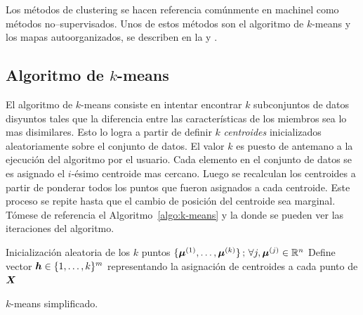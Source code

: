 Los métodos de clustering se hacen referencia comúnmente en \gls{machinel} como métodos no--supervisados. Unos de estos métodos son el algoritmo de $k$-means y los mapas autoorganizados, se describen en la  y .


\subsection{Algoritmo de $k$-means} \label{ch:k-means}
El algoritmo de $k$-means consiste en intentar encontrar $k$ subconjuntos de datos disyuntos tales que la diferencia entre las características de los miembros sea lo mas disimilares. Esto lo logra a partir de definir $k$ \textit{centroides} inicializados aleatoriamente sobre el conjunto de datos. El valor $k$ es puesto de antemano a la ejecución del algoritmo por el usuario. Cada elemento en el conjunto de datos se es asignado el $i$-ésimo centroide mas cercano. Luego se recalculan los centroides a partir de ponderar todos los puntos que fueron asignados a cada centroide. Este proceso se repite hasta que el cambio de posición del centroide sea marginal. Tómese de referencia el Algoritmo~\ref{algo:k-means} y la  donde se pueden ver las iteraciones del algoritmo.

\IncMargin{1em}
\begin{algorithm}[H]
  
  Inicialización aleatoria de los $k$ puntos $\{ {\bm{\mu}}^{(1)}, \ldots, {\bm{\mu}}^{(k)} \} \,;\, \forall j, {\bm{\mu}}^{(j)} \in \mathbb{R}^{n}$\;
  Define vector ${\bm{h}} \in \{1, \ldots, k\}^{m}$ representando la asignación de centroides a cada punto de ${\bm{X}}$\;
  
  \caption{$k$-means simplificado.}
  \label{algo:k-means}
\end{algorithm}
\DecMargin{1em}

